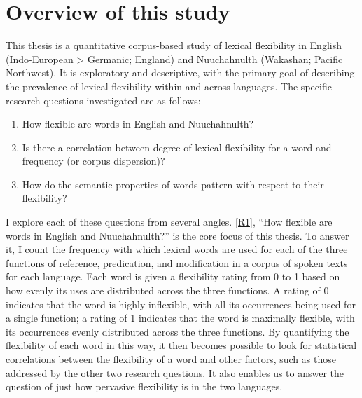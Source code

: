 \section{Overview of this study}
\label{sec:1.3}

This thesis is a quantitative corpus-based study of lexical flexibility in English (Indo-European > Germanic; England) and Nuuchahnulth (Wakashan; Pacific Northwest). It is exploratory and descriptive, with the primary goal of describing the prevalence of lexical flexibility within and across languages. The specific research questions investigated are as follows:

\begin{enumerate}[
  label      = {\textbf{R\arabic*:}},
  leftmargin = *,
  ref        = {R\arabic*}
]
  \item\label{R1} How flexible are words in English and Nuuchahnulth?
  \item\label{R2} Is there a correlation between degree of lexical flexibility for a word and frequency (or corpus dispersion)?
  \item\label{R3} How do the semantic properties of words pattern with respect to their flexibility?
\end{enumerate}

I explore each of these questions from several angles. \ref{R1}, \enquote{How flexible are words in English and Nuuchahnulth?} is the core focus of this thesis. To answer it, I count the frequency with which lexical words are used for each of the three functions of reference, predication, and modification in a corpus of spoken texts for each language. Each word is given a flexibility rating from 0 to 1 based on how evenly its uses are distributed across the three functions. A rating of 0 indicates that the word is highly inflexible, with all its occurrences being used for a single function; a rating of 1 indicates that the word is maximally flexible, with its occurrences evenly distributed across the three functions. By quantifying the flexibility of each word in this way, it then becomes possible to look for statistical correlations between the flexibility of a word and other factors, such as those addressed by the other two research questions. It also enables us to answer the question of just how pervasive flexibility is in the two languages.

